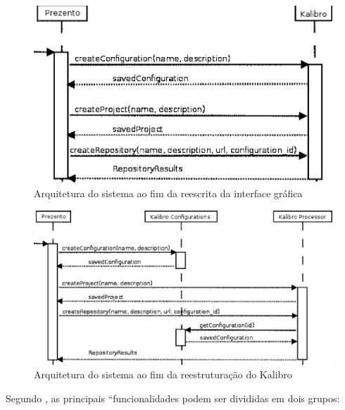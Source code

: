 \begin{figure}[!htb]
	\centering
    \includegraphics[keepaspectratio=true,scale=0.7]
    {figuras/prevProcessingSeqDiag.eps}
  \caption{Arquitetura do sistema ao fim da reescrita da interface gráfica
  \cite{meirellesCibse2015}}
	\label{fig:prevProcessingSeqDiag}
\end{figure}

\begin{figure}[!htb]
	\centering
    \includegraphics[keepaspectratio=true,scale=0.5]
    {figuras/processingSeqDiag.eps}
  \caption{Arquitetura do sistema ao fim da reestruturação do Kalibro
  \cite{meirellesCibse2015}}
	\label{fig:processingSeqDiag}
\end{figure}

\newpage

Segundo , as principais ``funcionalidades podem ser
divididas em dois grupos:

